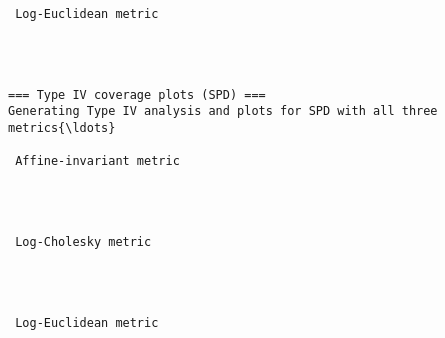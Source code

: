 \documentclass[11pt]{article}
\begin{document}
    \begin{Verbatim}[commandchars=\\\{\}]

 Log-Euclidean metric
    \end{Verbatim}

    \begin{center}
    \end{center}
    { \hspace*{\fill} \\}
    
    \begin{Verbatim}[commandchars=\\\{\}]

=== Type IV coverage plots (SPD) ===
Generating Type IV analysis and plots for SPD with all three metrics{\ldots}

 Affine-invariant metric
    \end{Verbatim}

    \begin{center}
    \end{center}
    { \hspace*{\fill} \\}
    
    \begin{Verbatim}[commandchars=\\\{\}]

 Log-Cholesky metric
    \end{Verbatim}

    \begin{center}
    \end{center}
    { \hspace*{\fill} \\}
    
    \begin{Verbatim}[commandchars=\\\{\}]

 Log-Euclidean metric
    \end{Verbatim}

    \begin{center}
    \end{center}
    { \hspace*{\fill} \\}
    

    
    
    
\end{document}
